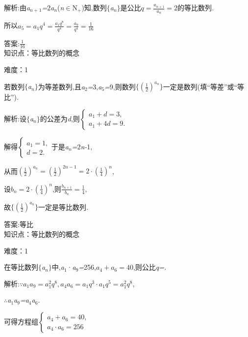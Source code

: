 \documentclass{article} %
\begin{document}
 解析:由\textit{a${}_{n+}$}${}_{1}$\textit{=}2\textit{a${}_{n}$}(\textit{n}$\mathrm{\in}$N\textit{${}_{+}$})知,数列$\mathrm{\{}$\textit{a${}_{n}$}$\mathrm{\}}$是公比$q=\frac{a_{n+1}}{a_n}=2$的等比数列\textit{.}

所以$a_5=a_1q^4=\frac{a_1q^8}{q^4}=\frac{a_9}{q^4}=\frac{1}{16}$

 答案:$\frac{1}{16}$ \\

知识点：等比数列的概念

难度：1

 若数列$\mathrm{\{}$\textit{a${}_{n}$}$\mathrm{\}}$为等差数列,且\textit{a}${}_{2}$\textit{=}3,\textit{a}${}_{5}$\textit{=}9,则数列$\{(\frac{1}{2})^{a_n}\}$一定是\textit{\underbar{　　　　　　}}数列(填``等差''或``等比'')\textit{.~}

 解析:设$\mathrm{\{}$\textit{a${}_{n}$}$\mathrm{\}}$的公差为\textit{d},则$\left\{
\begin{array}{l}
a_1+d=3, \\
a_1+4d=9.
\end{array}
\right.$

解得$\left\{
\begin{array}{l}
a_1=1, \\
d=2.
\end{array}
\right.$于是\textit{a${}_{n}$=}2\textit{n-}1,

从而$(\frac{1}{2})^{a_n}=(\frac{1}{2})^{2n-1}=2\cdot (\frac{1}{4})^n$,

设$b_n=2\cdot(\frac{1}{4})^n$,则$\frac{b_{n+1}}{b_n}=\frac{1}{4}$,

故$\{(\frac{1}{2})^{a_n}\}$一定是等比数列\textit{.}

 答案:等比 \\

知识点：等比数列的概念

难度：1

 在等比数列$\mathrm{\{}$\textit{a${}_{n}$}$\mathrm{\}}$中,\textit{a}${}_{1}$·\textit{a}${}_{9}$\textit{=}256,$a_4+a_6=40$,则公比\textit{q=\underbar{　}.~}

 解析:$\because a_1a_9=a_1^2 q^8,a_4a_6=a_1q^3\cdot a_1q^5=a_1^2 q^8$,

\textit{$\therefore$a}${}_{1}$\textit{a}${}_{9}$\textit{=a}${}_{4}$\textit{a}${}_{6}$\textit{.}

可得方程组$\left\{
\begin{array}{l}
a_4+a_6=40, \\
a_4\cdot a_6=256
\end{array}
\right.$
\end{document}
